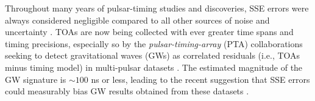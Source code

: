 \documentclass{aastex63}
\begin{document}
Throughout many years of pulsar-timing studies and discoveries, SSE errors were always considered negligible compared to all other sources of noise and uncertainty \citep{1990ApJ...361..300F,2006MNRAS.372.1549E}.
TOAs are now being collected with ever greater time spans and timing precisions, especially so by the \emph{pulsar-timing-array} (PTA) collaborations seeking to detect gravitational waves (GWs) as correlated residuals (i.e., TOAs minus timing model) in multi-pulsar datasets \citep{saz78,det79,fb90,ml13,dcl+16,h13,v+16}.
The estimated magnitude of the GW signature is $\sim 100$ ns or less, leading to the recent suggestion that SSE errors could measurably bias GW results obtained from these datasets \citep{2016MNRAS.455.4339T,2019ApJ...876...55R}.
%
\end{document}
